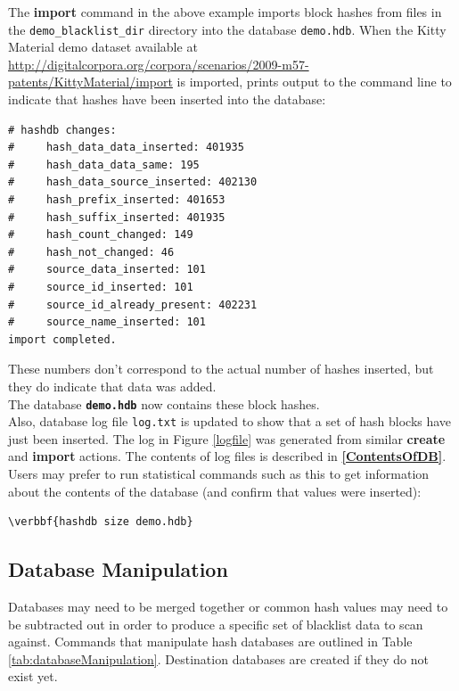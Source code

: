 \documentclass[11pt,fleqn]{article} %
\begin{document}
The \textbf{import} command in the above example imports block hashes from files in the \texttt{demo\_blacklist\_dir} directory into the database \texttt{demo.hdb}. When the Kitty Material demo dataset available at \url{http://digitalcorpora.org/corpora/scenarios/2009-m57-patents/KittyMaterial/import} is imported, \hdb prints output to the command line to indicate that hashes have been inserted into the database: 

\begingroup
\footnotesize
\begin{Verbatim}[fontfamily=courier]
# hashdb changes:
#     hash_data_data_inserted: 401935
#     hash_data_data_same: 195
#     hash_data_source_inserted: 402130
#     hash_prefix_inserted: 401653
#     hash_suffix_inserted: 401935
#     hash_count_changed: 149
#     hash_not_changed: 46
#     source_data_inserted: 101
#     source_id_inserted: 101
#     source_id_already_present: 402231
#     source_name_inserted: 101
import completed.
\end{Verbatim}
\endgroup
These numbers don't correspond to the actual number of hashes inserted, but they do indicate that data was added.\\

The database \texttt{\textbf{demo.hdb}} now contains these block hashes.\\

Also, database log file \texttt{log.txt} is updated to show that a set of hash blocks have just been inserted. The log in Figure \ref{logfile} was generated from similar \textbf{create} and \textbf{import} actions.  The contents of log files is described in \textbf{\autoref{ContentsOfDB}}.\\

Users may prefer to run statistical commands such as this to get information about the contents of the database (and confirm that values were inserted):
\begin{Verbatim}[commandchars=\\\{\}]
\verbbf{hashdb size demo.hdb}
\end{Verbatim}

\subsection{Database Manipulation}
\label{DatabaseManipulation}
Databases may need to be merged together or common hash values may need to be subtracted out in order to produce a specific set of blacklist data to scan against.
Commands that manipulate hash databases are outlined in Table \ref{tab:databaseManipulation}.
Destination databases are created if they do not exist yet.
\end{document}
